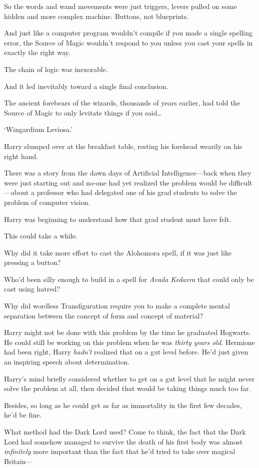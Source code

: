 So the words and wand movements were just triggers, levers pulled on some hidden and more complex machine. Buttons, not blueprints.

And just like a computer program wouldn’t compile if you made a single spelling error, the Source of Magic wouldn’t respond to you unless you cast your spells in exactly the right way.

The chain of logic was inexorable.

And it led inevitably toward a single final conclusion.

The ancient forebears of the wizards, thousands of years earlier, had told the Source of Magic to only levitate things if you said…

‘Wingardium Leviosa.’

Harry slumped over at the breakfast table, resting his forehead wearily on his right hand.

There was a story from the dawn days of Artificial Intelligence—back when they were just starting out and no-one had yet realized the problem would be difficult—about a professor who had delegated one of his grad students to solve the problem of computer vision.

Harry was beginning to understand how that grad student must have felt.

This could take a while.

Why did it take more effort to cast the Alohomora spell, if it was just like pressing a button?

Who’d been silly enough to build in a spell for \emph{Avada Kedavra} that could only be cast using hatred?

Why did wordless Transfiguration require you to make a complete mental separation between the concept of form and concept of material?

Harry might not be done with this problem by the time he graduated Hogwarts. He could still be working on this problem when he was \emph{thirty years old.} Hermione had been right, Harry \emph{hadn’t} realized that on a gut level before. He’d just given an inspiring speech about determination.

Harry’s mind briefly considered whether to get on a gut level that he might never solve the problem at all, then decided that would be taking things much too far.

Besides, so long as he could get as far as immortality in the first few decades, he’d be fine.

What method had the Dark Lord used? Come to think, the fact that the Dark Lord had somehow managed to survive the death of his first body was almost \emph{infinitely} more important than the fact that he’d tried to take over magical Britain—

